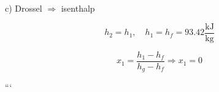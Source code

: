 c) Drossel \(\Rightarrow\) isenthalp

\[
h_2 = h_1, \quad h_1 = h_f = 93.42 \frac{\text{kJ}}{\text{kg}}
\]

\[
x_1 = \frac{h_1 - h_f}{h_g - h_f} \Rightarrow x_1 = 0
\]

```